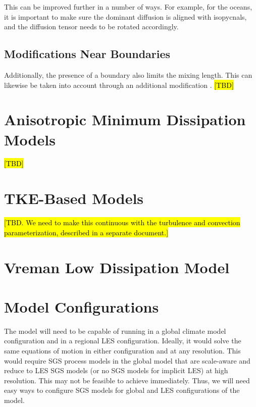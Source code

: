 \documentclass{report}
\begin{document}
This can be improved further in a number of ways. For example, for the oceans, it is important to make sure the dominant diffusion is aligned with isopycnals, and the diffusion tensor needs to be rotated accordingly. 

\subsection{Modifications Near Boundaries}
 
Additionally, the presence of a boundary also limits the mixing length. This can likewise be taken into account through an additional modification \citep{Kleissl03a}.  \hl{[TBD]}

\section{Anisotropic Minimum Dissipation Models}

\hl{[TBD]}
\citep{Abkar17a}

\section{TKE-Based Models}

\citep{Deardorff80a}

\hl{[TBD. We need to make this continuous with the turbulence and convection parameterization, described in a separate document.]}

\section{Vreman Low Dissipation Model }

\citep{vreman2004}

\section{Model Configurations} 

The model will need to be capable of running in a global climate model configuration and in a regional LES configuration. Ideally, it would solve the same equations of motion in either configuration and at any resolution. This would require SGS process models in the global model that are scale-aware and reduce to LES SGS models (or no SGS models for implicit LES) at high resolution. This may not be feasible to achieve immediately. Thus, we will need easy ways to configure SGS models for global and LES configurations of the model. 
\end{document}
